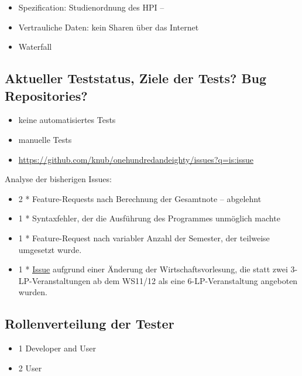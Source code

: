 \documentclass[ngerman]{article}
\begin{document}
\begin{itemize}
    \item
        Spezification: Studienordnung des HPI -- 
    \item
        Vertrauliche Daten: kein Sharen über das Internet
    \item
        Waterfall
\end{itemize}

\subsection{Aktueller Teststatus, Ziele der Tests? Bug Repositories?}

\begin{itemize}
    \item
        keine automatisiertes Tests
    \item
        manuelle Tests
    \item
        \url{https://github.com/knub/onehundredandeighty/issues?q=is:issue}
\end{itemize}

Analyse der bisherigen Issues:

\begin{itemize}
    \item
        2 * Feature-Requests nach Berechnung der Gesamtnote -- abgelehnt
    \item
        1 * Syntaxfehler, der die Ausführung des Programmes unmöglich machte
    \item
        1 * Feature-Request nach variabler Anzahl der Semester, der teilweise umgesetzt wurde.
    \item
        1 * \href{https://github.com/knub/onehundredandeighty/pull/5}{\underline{Issue}} aufgrund einer Änderung
        der Wirtschaftsvorlesung, die statt zwei 3-LP-Veranstaltungen ab dem WS11/12 als eine
        6-LP-Veranstaltung angeboten wurden.
\end{itemize}

\subsection{Rollenverteilung der Tester}

\begin{itemize}
    \item 1 Developer and User
    \item 2 User
\end{itemize}
\end{document}
